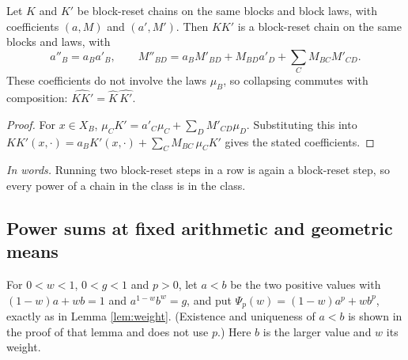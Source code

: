 \begin{lemma}\label{br:lem:closure}
Let \(K\) and \(K'\) be block-reset chains on the same blocks and block laws,
with coefficients \((a,M)\) and \((a',M')\). Then \(KK'\) is a block-reset
chain on the same blocks and laws, with
\[
a''_B=a_Ba'_B,\qquad
M''_{BD}=a_BM'_{BD}+M_{BD}a'_D+\sum_C M_{BC}M'_{CD}.
\]
These coefficients do not involve the laws \(\mu_B\), so collapsing commutes
with composition: \(\widehat{KK'}=\widehat K\,\widehat{K'}\).
\end{lemma}
\begin{proof}
For \(x\in X_B\),
\(\mu_CK'=a'_C\mu_C+\sum_D M'_{CD}\mu_D\). Substituting this into
\(KK'(x,\cdot)=a_BK'(x,\cdot)+\sum_C M_{BC}\,\mu_CK'\) gives the stated
coefficients.
\end{proof}

\noindent\textit{In words.} Running two block-reset steps in a row is again a
block-reset step, so every power of a chain in the class is in the class.

\subsection{Power sums at fixed arithmetic and geometric means}

For \(0<w<1\), \(0<g<1\) and \(p>0\), let \(a<b\) be the two positive values
with \((1-w)a+wb=1\) and \(a^{1-w}b^w=g\), and put
\(\Psi_p(w)=(1-w)a^p+wb^p\), exactly as in Lemma \ref{lem:weight}.
(Existence and uniqueness of \(a<b\) is shown in the proof of that lemma
and does not use \(p\).) Here \(b\) is the larger value and \(w\) its
weight.


